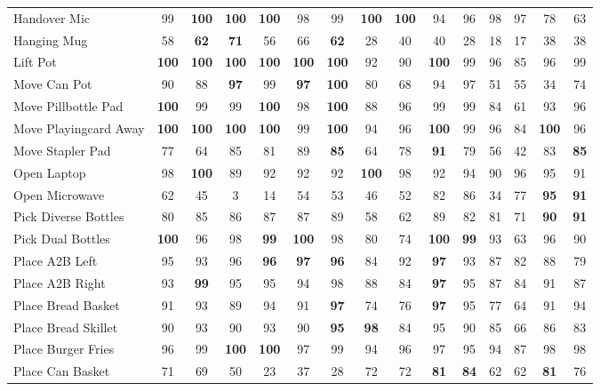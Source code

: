 \documentclass{article}
\begin{document}
\begin{table}[t]
{\begin{tabular}{lcc|cc|cc|cc|cc|cc|cc}
Handover Mic & 99 & \textbf{100} & \textbf{100} & \textbf{100} & 98 & 99 & \textbf{100} & \textbf{100} & 94 & 96 & 98 & 97 & 78 & 63 \\
Hanging Mug & 58 & \textbf{62} & \textbf{71} & 56 & 66 & \textbf{62} & 28 & 40 & 40 & 28 & 18 & 17 & 38 & 38 \\
Lift Pot & \textbf{100} & \textbf{100} & \textbf{100} & \textbf{100} & \textbf{100} & \textbf{100} & 92 & 90 & \textbf{100} & 99 & 96 & 85 & 96 & 99 \\
Move Can Pot & 90 & 88 & \textbf{97} & 99 & \textbf{97} & \textbf{100} & 80 & 68 & 94 & 97 & 51 & 55 & 34 & 74 \\
Move Pillbottle Pad & \textbf{100} & 99 & 99 & \textbf{100} & 98 & \textbf{100} & 88 & 96 & 99 & 99 & 84 & 61 & 93 & 96 \\
Move Playingcard Away & \textbf{100} & \textbf{100} & \textbf{100} & \textbf{100} & 99 & \textbf{100} & 94 & 96 & \textbf{100} & 99 & 96 & 84 & \textbf{100} & 96 \\
Move Stapler Pad & 77 & 64 & 85 & 81 & 89 & \textbf{85} & 64 & 78 & \textbf{91} & 79 & 56 & 42 & 83 & \textbf{85} \\
Open Laptop & 98 & \textbf{100} & 89 & 92 & 92 & 92 & \textbf{100} & 98 & 92 & 94 & 90 & 96 & 95 & 91 \\
Open Microwave & 62 & 45 & 3 & 14 & 54 & 53 & 46 & 52 & 82 & 86 & 34 & 77 & \textbf{95} & \textbf{91} \\
Pick Diverse Bottles & 80 & 85 & 86 & 87 & 87 & 89 & 58 & 62 & 89 & 82 & 81 & 71 & \textbf{90} & \textbf{91} \\
Pick Dual Bottles & \textbf{100} & 96 & 98 & \textbf{99} & \textbf{100} & 98 & 80 & 74 & \textbf{100} & \textbf{99} & 93 & 63 & 96 & 90 \\
Place A2B Left & 95 & 93 & 96 & \textbf{96} & \textbf{97} & \textbf{96} & 84 & 92 & \textbf{97} & 93 & 87 & 82 & 88 & 79 \\
Place A2B Right & 93 & \textbf{99} & 95 & 95 & 94 & 98 & 88 & 84 & \textbf{97} & 95 & 87 & 84 & 91 & 87 \\
Place Bread Basket & 91 & 93 & 89 & 94 & 91 & \textbf{97} & 74 & 76 & \textbf{97} & 95 & 77 & 64 & 91 & 94 \\
Place Bread Skillet & 90 & 93 & 90 & 93 & 90 & \textbf{95} & \textbf{98} & 84 & 95 & 90 & 85 & 66 & 86 & 83 \\
Place Burger Fries & 96 & 99 & \textbf{100} & \textbf{100} & 97 & 99 & 94 & 96 & 97 & 95 & 94 & 87 & 98 & 98 \\
Place Can Basket & 71 & 69 & 50 & 23 & 37 & 28 & 72 & 72 & \textbf{81} & \textbf{84} & 62 & 62 & \textbf{81} & 76 \\

\end{tabular}}
\end{table}
\end{document}
